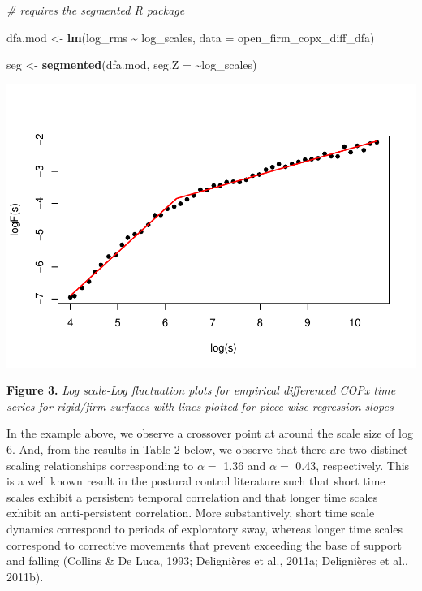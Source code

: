 \documentclass[
  man]{apa6}
\newenvironment{Shaded}{\begin{snugshade}}{\end{snugshade}}
\newcommand{\AttributeTok}[1]{\textcolor[rgb]{0.13,0.29,0.53}{#1}}
\newcommand{\CommentTok}[1]{\textcolor[rgb]{0.56,0.35,0.01}{\textit{#1}}}
\newcommand{\FunctionTok}[1]{\textcolor[rgb]{0.13,0.29,0.53}{\textbf{#1}}}
\newcommand{\NormalTok}[1]{#1}
\newcommand{\OtherTok}[1]{\textcolor[rgb]{0.56,0.35,0.01}{#1}}
\newcommand{\SpecialCharTok}[1]{\textcolor[rgb]{0.81,0.36,0.00}{\textbf{#1}}}
\begin{document}
\begin{Shaded}
\begin{Highlighting}[]
\CommentTok{\# requires the segmented R package}

\NormalTok{dfa.mod }\OtherTok{\textless{}{-}} \FunctionTok{lm}\NormalTok{(log\_rms }\SpecialCharTok{\textasciitilde{}}\NormalTok{ log\_scales, }\AttributeTok{data =}\NormalTok{ open\_firm\_copx\_diff\_dfa)}

\NormalTok{seg }\OtherTok{\textless{}{-}} \FunctionTok{segmented}\NormalTok{(dfa.mod, }\AttributeTok{seg.Z =} \SpecialCharTok{\textasciitilde{}}\NormalTok{log\_scales)}
\end{Highlighting}
\end{Shaded}

\includegraphics{fractal_regression_paper_brm_files/figure-latex/unnamed-chunk-7-1.pdf}

\textbf{Figure 3.} \emph{Log scale-Log fluctuation plots for empirical differenced
COPx time series for rigid/firm surfaces with lines plotted for
piece-wise regression slopes}

In the example above, we observe a crossover point at around the scale
size of log 6. And, from the results in Table 2 below, we observe that
there are two distinct scaling relationships corresponding to \(\alpha =\)
1.36 and \(\alpha =\) 0.43, respectively. This is a well known result in
the postural control literature such that short time scales exhibit a
persistent temporal correlation and that longer time scales exhibit an
anti-persistent correlation. More substantively, short time scale
dynamics correspond to periods of exploratory sway, whereas longer time
scales correspond to corrective movements that prevent exceeding the
base of support and falling (Collins \& De Luca, 1993; Delignières et al., 2011a; Delignières et al., 2011b).
\end{document}
